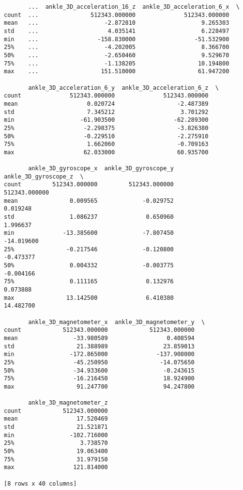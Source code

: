 \documentclass[11pt]{article}
\begin{document}
\begin{verbatim}
       ...  ankle_3D_acceleration_16_z  ankle_3D_acceleration_6_x  \
count  ...               512343.000000              512343.000000   
mean   ...                   -2.872810                   9.265303   
std    ...                    4.035141                   6.228497   
min    ...                 -158.830000                 -51.532900   
25%    ...                   -4.202005                   8.366700   
50%    ...                   -2.650460                   9.529670   
75%    ...                   -1.138205                  10.194800   
max    ...                  151.510000                  61.947200   

       ankle_3D_acceleration_6_y  ankle_3D_acceleration_6_z  \
count              512343.000000              512343.000000   
mean                    0.020724                  -2.487389   
std                     7.345212                   3.701292   
min                   -61.903500                 -62.289300   
25%                    -2.298375                  -3.826380   
50%                    -0.229510                  -2.275910   
75%                     1.662060                  -0.709163   
max                    62.033000                  60.935700   

       ankle_3D_gyroscope_x  ankle_3D_gyroscope_y  ankle_3D_gyroscope_z  \
count         512343.000000         512343.000000         512343.000000   
mean               0.009565             -0.029752              0.019248   
std                1.086237              0.650960              1.996637   
min              -13.385600             -7.807450            -14.019600   
25%               -0.217546             -0.120800             -0.473377   
50%                0.004332             -0.003775             -0.004166   
75%                0.111165              0.132976              0.073888   
max               13.142500              6.410380             14.482700   

       ankle_3D_magnetometer_x  ankle_3D_magnetometer_y  \
count            512343.000000            512343.000000   
mean                -33.980589                 0.408594   
std                  21.388989                23.859013   
min                -172.865000              -137.908000   
25%                 -45.250950               -14.075650   
50%                 -34.933600                -0.243615   
75%                 -16.216450                18.924900   
max                  91.247700                94.247800   

       ankle_3D_magnetometer_z  
count            512343.000000  
mean                 17.520469  
std                  21.521871  
min                -102.716000  
25%                   3.738570  
50%                  19.063400  
75%                  31.979150  
max                 121.814000  

[8 rows x 40 columns]
    \end{verbatim}
\end{document}
